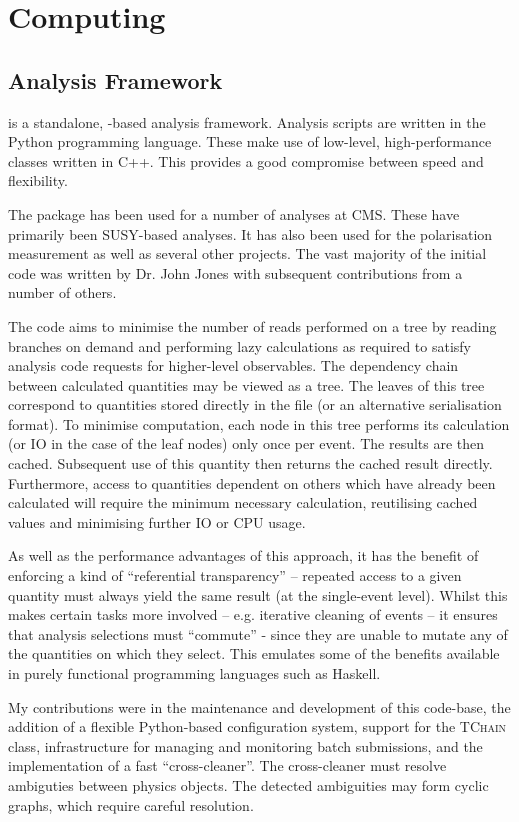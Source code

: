 \chapter{Computing}
\section{ Analysis Framework}
 is a standalone, \root-based analysis framework. Analysis
scripts are written in the Python programming language. These make use of
low-level, high-performance classes written in C++. This provides a good
compromise between speed and flexibility.

The  package has been used for a number of analyses at
\ac{CMS}. These have primarily been \ac{SUSY}-based analyses. It has also been
used for the \PW polarisation measurement as well as several other projects. The
vast majority of the initial code was written by Dr. John Jones with subsequent
contributions from a number of others.

The  code aims to minimise the number of reads performed on a \root tree
by reading branches on demand and performing lazy calculations as required to
satisfy analysis code requests for higher-level observables. The dependency
chain between calculated quantities may be viewed as a tree. The leaves of this
tree correspond to quantities stored directly in the \root file (or an
alternative serialisation format). To minimise computation, each node in this
tree performs its calculation (or \ac{IO} in the case of the leaf nodes) only
once per event. The results are then cached. Subsequent use of this quantity
then returns the cached result directly. Furthermore, access to quantities
dependent on others which have already been calculated will require the minimum
necessary calculation, reutilising cached values and minimising further \ac{IO}
or CPU usage.

As well as the performance advantages of this approach, it has the benefit of
enforcing a kind of ``referential transparency'' -- repeated access to a given
quantity must always yield the same result (at the single-event level). Whilst
this makes certain tasks more involved -- e.g. iterative cleaning of events --
it ensures that analysis selections must ``commute'' - since they are unable to
mutate any of the quantities on which they select. This emulates some of the
benefits available in purely functional programming languages such as Haskell.

My contributions were in the maintenance and development of this code-base, the
addition of a flexible Python-based configuration system, support for the \root
\textsc{TChain} class, infrastructure for managing and monitoring batch
submissions, and the implementation of a fast ``cross-cleaner''. The
cross-cleaner must resolve ambiguties between physics objects. The detected
ambiguities may form cyclic graphs, which require careful resolution.

